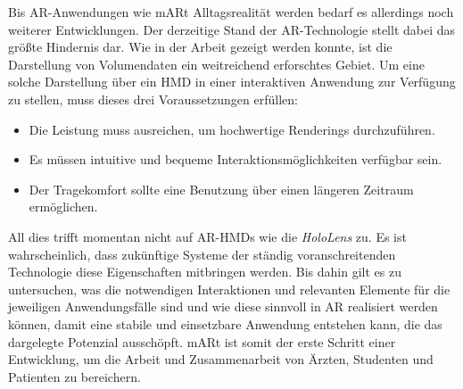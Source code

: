 Bis AR-Anwendungen wie mARt Alltagsrealität werden bedarf es allerdings noch weiterer Entwicklungen.
Der derzeitige Stand der AR-Technologie stellt dabei das größte Hindernis dar. Wie in der Arbeit gezeigt werden konnte, ist die Darstellung von Volumendaten ein weitreichend erforschtes Gebiet. Um eine solche Darstellung über ein HMD in einer interaktiven Anwendung zur Verfügung zu stellen, muss dieses drei Voraussetzungen erfüllen:

\begin{itemize}
\item Die Leistung muss ausreichen, um hochwertige Renderings durchzuführen.
\item Es müssen intuitive und bequeme Interaktionsmöglichkeiten verfügbar sein.
\item Der Tragekomfort sollte eine Benutzung über einen längeren Zeitraum ermöglichen.
\end{itemize}

All dies trifft momentan nicht auf AR-HMDs wie die \textit{HoloLens} zu. Es ist wahrscheinlich, dass zukünftige Systeme der ständig voranschreitenden Technologie diese Eigenschaften mitbringen werden. 
Bis dahin gilt es zu untersuchen, was die notwendigen Interaktionen und relevanten Elemente für die jeweiligen Anwendungsfälle sind und wie diese sinnvoll in AR realisiert werden können, damit eine stabile und einsetzbare Anwendung entstehen kann, die das dargelegte Potenzial ausschöpft.
mARt ist somit der erste Schritt einer Entwicklung, um die Arbeit und Zusammenarbeit von Ärzten, Studenten und Patienten zu bereichern.
